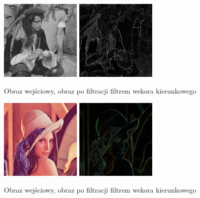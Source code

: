 \documentclass[final,a4paper,openany,12pt]{mwbk}
\begin{document}
\begin{figure}[H]
	\begin{center}
		\includegraphics[width=0.35\textwidth]{pirate_gray}
		\includegraphics[width=0.35\textwidth]{pirate_gray_vdgPrewitt_result}
	\end{center}
	\caption{Obraz wejściowy, obraz po filtracji filtrem wekora kierunkowego}
\end{figure}

\begin{figure}[H]
	\begin{center}
		\includegraphics[width=0.35\textwidth]{lena_color}
		\includegraphics[width=0.35\textwidth]{lena_color_vdgPrewitt_result}
	\end{center}
	\caption{Obraz wejściowy, obraz po filtracji filtrem wekora kierunkowego}
\end{figure}
\end{document}
